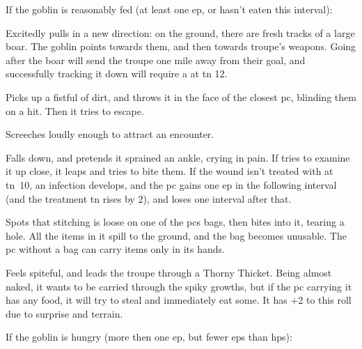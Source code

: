 \documentclass[10pt,twoside]{book}
\begin{document}
If the goblin is reasonably fed (at least one \gls{ep}, or hasn't eaten this \gls{interval}):

\begin{dlist}
  \item
  Excitedly pulls in a new direction: on the ground, there are fresh tracks of a large boar.
  The goblin points towards them, and then towards troupe's weapons.
  Going after the boar will send the troupe one mile away from their goal, and successfully tracking it down will require a  at \gls{tn} 12.
  \item
  Picks up a fistful of dirt, and throws it in the face of the closest \gls{pc}, blinding them on a hit.
  Then it tries to escape.
  \item
  Screeches loudly enough to attract an encounter.
  \item
  Falls down, and pretends it sprained an ankle, crying in pain.
  If  tries to examine it up close, it leaps and tries to bite them.
  If the wound isn't treated with  at \gls{tn}~10, an infection develops, and the \gls{pc} gains one \gls{ep} in the following \gls{interval} (and the treatment \gls{tn} rises by 2), and loses  one \gls{interval} after that.
  \item
  Spots that stitching is loose on one of the \glspl{pc} bags, then bites into it, tearing a hole.
  All the items in it spill to the ground, and the bag becomes unusable.
  The \gls{pc} without a bag can carry items only in its hands.
  \item
  Feels spiteful, and leads the troupe through a Thorny Thicket.%
Being almost naked, it wants to be carried through the spiky growths, but if the \gls{pc} carrying it has any food, it will try to steal and immediately eat some.
It has +2 to this roll due to surprise and terrain.


\end{dlist}


If the goblin is hungry (more then one \gls{ep}, but fewer \glspl{ep} than \glspl{hp}):
\end{document}
